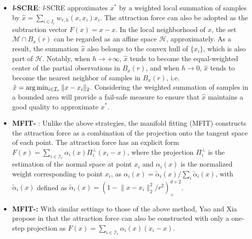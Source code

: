 \documentclass[aos,preprint]{imsart}
\theoremstyle{remark}
\begin{document}
\begin{appendix}
\begin{itemize}
\item{\bf {\it l}-SCRE}:  {\it l}-SCRE approximates ${x}^*$ by a weighted local summation of samples by $\hat{x} = \sum_{i\in I_r} w_{r,h} ({x}, x_i)x_i$. The attraction force can also be adopted as the subtraction vector $F(x) = \hat{x}-x$. In the local neighborhood of ${x}$, the set ${\mathcal M} \cap  B_{{x}}(r)$ can be regarded as an affine space $\mathcal H$, approximately. As a result, the summation $\hat{x}$ also belongs to the convex hull of $\{x_i\}$, which is also part of $\mathcal H$. Notably, when $h\rightarrow +\infty$, $\hat{x}$ tends to become the equal-weighted center of the partial observations in $B_{{x}}(r)$, and when $h\rightarrow 0$, $\hat{x}$ tends to become the nearest neighbor of samples in $B_{{x}}(r)$, i.e. $\hat{x} = \arg\min_{i \in {\cal I}_r} \|{x}-x_i\|_2$. Considering the weighted summation of samples in a bounded area will provide a fail-safe measure to ensure that $\hat{x}$ maintains a good quality to approximate ${x}^*$.
\item{\bf MFIT-} :  Unlike the above strategies, the manifold fitting (MFIT) \cite{fefferman2018fitting} constructs the attraction force as a combination of the projection onto the tangent space of each point. The attraction force has an explicit form $F(x)= \sum_{i\in{\mathcal I}_r}\alpha_i(x) \Pi_i^\perp (x_i - x)$, where the projection $\Pi_i^\perp$ is the estimation of the normal space at point $x_i$ and $\alpha_i(x)$ is the normalized weight corresponding to point $x_i$, as $\alpha_i(x) = \tilde{\alpha}_i(x)/ \sum_i \tilde{\alpha}_i(x)$, with $\tilde{\alpha}_i(x)$ defined as $\tilde{\alpha}_i(x) = (1-{\|x-x_i\|_2^2}/{r^2})^{d+2}_+$.
\item{\bf MFIT-:} With similar settings to those of the above method, Yao and Xia propose in \cite{yao2019manifold} that the attraction force can also be constructed with only a one-step projection as $F(x)= \sum_{i\in{\mathcal I}_r}\alpha_i(x)  (x_i - x)$.
\end{itemize}

\end{appendix}
\end{document}
